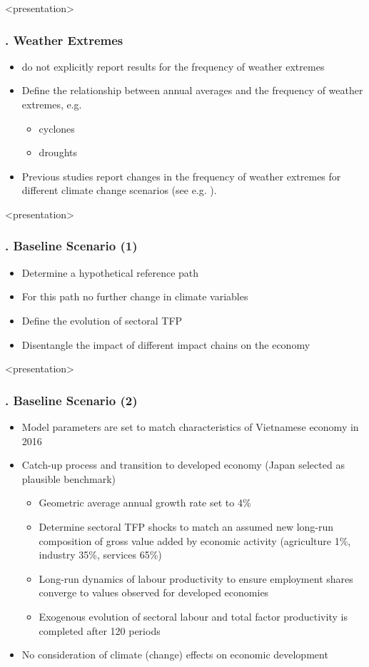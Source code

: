 \documentclass[11pt,aspectratio=169]{beamer}
\begin{document}
\begin{frame}<presentation>
	\frametitle{{\thesection.\thesubsection} Weather Extremes}
	\begin{itemize}
		\item \cite{thuc2016climate} do not explicitly report results for the frequency of weather extremes
		\item Define the relationship between annual averages and the frequency of weather extremes, e.g. 
			\begin{itemize}
				\item cyclones
				\item droughts
			\end{itemize}
		\item Previous studies report changes in the frequency of weather extremes for different climate change scenarios (see e.g. \cite{arndt2015economic}). 
	\end{itemize}
\end{frame}


\begin{frame}<presentation>
	\frametitle{{\thesection.\thesubsection} Baseline Scenario (1)}
	\begin{itemize}
		\item Determine a hypothetical reference path
		\item For this path no further change in climate variables
		\item Define the evolution of sectoral TFP
		\item Disentangle the impact of different impact chains on the economy
	\end{itemize}
\end{frame}


\begin{frame}<presentation>
	\frametitle{{\thesection.\thesubsection} Baseline Scenario (2)}
	\begin{itemize}
		\item	Model parameters are set to match characteristics of Vietnamese economy in 2016
		\item	Catch-up process and transition to developed economy (Japan selected as plausible benchmark)
		\begin{itemize}
			\item	Geometric average annual growth rate set to 4\% 
			\item	Determine sectoral TFP shocks to match an assumed new long-run composition of gross value added by economic activity (agriculture 1\%, industry 35\%, services 65\%)
			\item	Long-run dynamics of labour productivity to ensure employment shares converge to values observed for developed economies
			\item	Exogenous evolution of sectoral labour and total factor productivity is completed after 120 periods
		\end{itemize}
		\item	No consideration of climate (change) effects on economic development
	\end{itemize}
\end{frame}
\end{document}
